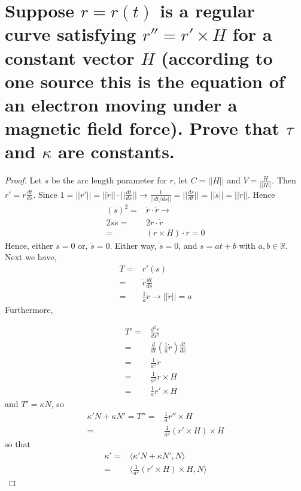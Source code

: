 \documentclass[12pt]{amsart}
\begin{document}
\section{Suppose $r=r(t)$ is a regular curve satisfying $r''=r'\times H$ for a constant vector $H$ (according to one source this is the equation of an electron moving under a magnetic field force). Prove that $\tau$ and $\kappa$ are constants.}
\begin{proof}
Let $s$ be the arc length parameter for $r$, let $C=||H||$ and $V=\frac{H}{||H||}$. Then $r'=\dot r\frac{dt}{ds}$. Since $1=||r'||=||\dot r||\cdot||\frac{dt}{ds}||\rightarrow\frac{1}{||dt/ds||}=||\frac{ds}{dt}||=||\dot s||=||\dot r||$. Hence 
\begin{align*}
	\left(\dot s\right)^2=&\dot r\cdot\dot r\rightarrow
	\\2\dot s\ddot s=&2\ddot r\cdot\dot r
	\\=&(\dot r\times H)\cdot \dot r=0
\end{align*}
Hence, either $\dot s=0$ or, $\ddot s=0$. Either way, $\ddot s=0$, and $s=at+b$ with $a,b\in\mathbb{R}$. Next we have,
\begin{align*}
	T=&r'(s)
	\\=&\dot r\frac{dt}{ds}
	\\=&\frac{1}{a}\dot r\rightarrow||\dot r||=a
\end{align*}
Furthermore,
\begin{comment}\begin{align*}
	0=&T\cdot N
	\\=&r'\cdot N
\end{align*}
\end{comment}
\begin{align*}
	T'=&\frac{d^2r}{ds^2}
	\\=&\frac{d}{dt}\left(\frac{1}{a}\dot r\right)\frac{dt}{ds}
	\\=&\frac{1}{a^2}\ddot r
	\\=&\frac{1}{a^2}\dot r\times H
	\\=&\frac{1}{a}r'\times H
\end{align*}
and $T'=\kappa N$, so 
\begin{align*}
	\kappa'N+\kappa N'=T''=&\frac{1}{a}r''\times H
	\\=&\frac{1}{a^2}(r'\times H)\times H
\end{align*}
so that
\begin{align*}
	\kappa'=&\langle\kappa'N+\kappa N',N\rangle
	\\=&\langle\frac{1}{a^2}(r'\times H)\times H, N\rangle

\end{align*}
\end{proof}
\end{document}

